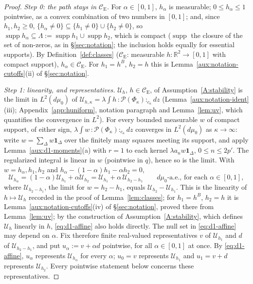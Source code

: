 \documentclass[11pt,a4paper]{article}
\theoremstyle{plain}
\theoremstyle{definition}
\theoremstyle{plain}
\theoremstyle{definition}
\newcommand{\R}{\mathbb{R}}
\newcommand{\CE}{\mathcal{C}_{\mathrm E}}
\DeclareMathOperator{\supp}{supp}
\newcommand{\Uc}{\mathcal U}
\newcommand{\dmu}{d\mu_0}
\begin{document}
\begin{proof}
\emph{Step 0: the path stays in $\CE$.} For $\alpha\in[0,1]$, $h_\alpha$ is measurable;
$0\le h_\alpha\le1$ pointwise, as a convex combination of two numbers in $[0,1]$; and, since
$h_1,h_2\ge0$, $\{h_\alpha\ne0\}\subseteq\{h_1\ne0\}\cup\{h_2\ne0\}$, so
$\supp h_\alpha\subseteq\Lambda:=\supp h_1\cup\supp h_2$, which is compact ($\supp$ the
closure of the set of non-zeros, as in \S\ref{sec:notation}; the inclusion holds equally for
essential supports). By Definition~\ref{def:classes} ($\CE$: measurable
$h:\R^2\to[0,1]$ with compact support), $h_\alpha\in\CE$. For $h_1=h^B$, $h_2=h$ this is
Lemma~\ref{aux:notation-cutoffs}(ii) of \S\ref{sec:notation}.

\emph{Step 1: linearity, and representatives.} $\Uc_h$, $h\in\CE$, of
Assumption~\ref{A:stability} is the limit in $L^2(\dmu)$ of $\Uc_{h,\kappa}=\lambda\int
h\,{:}\mathscr P(\Phi_\kappa){:}_{c_\kappa}dz$ (Lemma~\ref{aux:notation-ident}(iii);
Appendix~\ref{app:huniform}, notation paragraph and Lemma~\ref{lem:uv}, which quantifies the
convergence in $L^2$). For every bounded measurable $w$ of compact support, of
either sign, $\lambda\int w\,{:}\mathscr P(\Phi_\kappa){:}_{c_\kappa}dz$ converges in
$L^2(\dmu)$ as $\kappa\to\infty$: write $w=\sum_\Delta w\mathbf 1_\Delta$ over the finitely many
squares meeting its support, and apply Lemma~\ref{aux:d1-moments}(a) with $r=1$ to each kernel
$\lambda a_nw\mathbf 1_\Delta$, $0\le n\le2p'$. The regularized integral is linear in $w$
(pointwise in $q$), hence so is the limit. With $w=h_\alpha,h_1,h_2$ and
$h_\alpha-(1-\alpha)h_1-\alpha h_2=0$,
\begin{equation}\label{eq:d1-affine}
 \Uc_{h_\alpha}=(1-\alpha)\Uc_{h_1}+\alpha\Uc_{h_2}=\Uc_{h_1}+\alpha\,\Uc_{h_2-h_1}
 \qquad\dmu\text{-a.e., for each }\alpha\in[0,1],
\end{equation}
where $\Uc_{h_2-h_1}$, the limit for $w=h_2-h_1$, equals $\Uc_{h_2}-\Uc_{h_1}$. This is the
linearity of $h\mapsto\Uc_h$ recorded in the proof of Lemma~\ref{lem:classes}; for $h_1=h^B$, $h_2=h$ it is Lemma~\ref{aux:notation-cutoffs}(iv) of
\S\ref{sec:notation}, proved there from Lemma~\ref{lem:uv}; by the construction of
Assumption~\ref{A:stability}, which defines $\Uc_h$ linearly in $h$, \eqref{eq:d1-affine}
also holds directly.
The null set in \eqref{eq:d1-affine} may depend on $\alpha$. Fix therefore
finite real-valued representatives $v$ of $\Uc_{h_1}$ and $d$ of $\Uc_{h_2-h_1}$, and put
$u_\alpha:=v+\alpha d$ pointwise, for all $\alpha\in[0,1]$ at once. By
\eqref{eq:d1-affine}, $u_\alpha$ represents $\Uc_{h_\alpha}$ for every $\alpha$; $u_0=v$
represents $\Uc_{h_1}$ and $u_1=v+d$ represents $\Uc_{h_2}$. Every pointwise statement below
concerns these representatives.


\end{proof}
\end{document}
